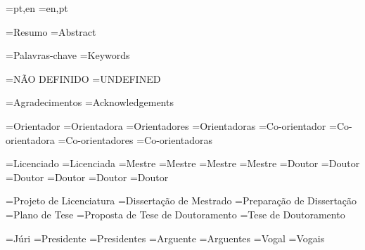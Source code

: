 \UNL@abstractorder[pt]={pt,en}
\UNL@abstractorder[en]={en,pt}



\UNL@abstractname[pt]={Resumo}
\UNL@abstractname[en]={Abstract}

\UNL@keywordsname[pt]={Palavras-chave}
\UNL@keywordsname[en]={Keywords}

\UNL@notdefined[pt]={NÃO DEFINIDO}
\UNL@notdefined[en]={UNDEFINED}

\UNL@acknowledgementsname[pt]={Agradecimentos}
\UNL@acknowledgementsname[en]={Acknowledgements}


\UNL@adviserstr[1,m,pt]={Orientador}
\UNL@adviserstr[1,f,pt]={Orientadora}
\UNL@adviserstr[2,m,pt]={Orientadores}
\UNL@adviserstr[2,f,pt]={Orientadoras}
\UNL@coadviserstr[1,m,pt]={Co-orientador}
\UNL@coadviserstr[1,f,pt]={Co-orientadora}
\UNL@coadviserstr[2,m,pt]={Co-orientadores}
\UNL@coadviserstr[2,f,pt]={Co-orientadoras}

\UNL@degreestr[bsc,m,pt]={Licenciado}
\UNL@degreestr[bsc,f,pt]={Licenciada}
\UNL@degreestr[msc,m,pt]={Mestre}
\UNL@degreestr[msc,f,pt]={Mestre}
\UNL@degreestr[prepmsc,m,pt]={Mestre}
\UNL@degreestr[prepmsc,f,pt]={Mestre}
\UNL@degreestr[phd,m,pt]={Doutor}
\UNL@degreestr[phd,f,pt]={Doutor}
\UNL@degreestr[phdplan,m,pt]={Doutor}
\UNL@degreestr[phdplan,f,pt]={Doutor}
\UNL@degreestr[propphd,m,pt]={Doutor}
\UNL@degreestr[propphd,f,pt]={Doutor}

\UNL@doctypestr[bsc,pt]={Projeto de Licenciatura}
\UNL@doctypestr[msc,pt]={Dissertação de Mestrado}
\UNL@doctypestr[prepmsc,pt]={Preparação de Dissertação}
\UNL@doctypestr[phdplan,pt]={Plano de Tese}
\UNL@doctypestr[phd,pt]={Proposta de Tese de Doutoramento}
\UNL@doctypestr[propphd,pt]={Tese de Doutoramento}

\UNL@committeetitlestr[pt]={Júri}
\UNL@chairstr[1,pt]={Presidente}
\UNL@chairstr[2,pt]={Presidentes}
\UNL@raporteurstr[1,pt]={Arguente}
\UNL@raporteurstr[2,pt]={Arguentes}
\UNL@memberstr[1,pt]={Vogal}
\UNL@memberstr[2,pt]={Vogais}

